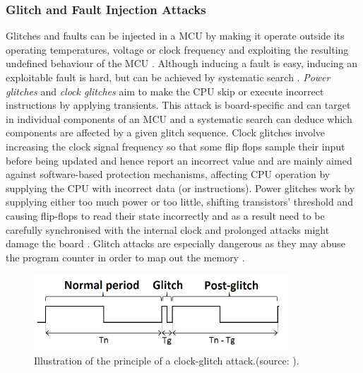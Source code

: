 	\subsubsection{Glitch and Fault Injection Attacks}
	Glitches and faults can be injected in a MCU by making it operate outside its operating temperatures, voltage or clock frequency and exploiting the resulting undefined behaviour of the MCU \citep{sergei:thesis} \citep{avr_mega}. Although inducing a fault is easy, inducing an exploitable fault is hard, but can be achieved by systematic search \citep{sergei:thesis} \citep{glitches_paper} \citep{website:riscure}. \emph{Power glitches} and \emph{clock glitches} aim to make the CPU skip or execute incorrect instructions by applying transients. This attack is board-specific and can target in individual components of an MCU and a systematic search can deduce which components are affected by a given glitch sequence. Clock glitches involve increasing the clock signal frequency so that some flip flops sample their input before being updated and hence report an incorrect value \citep{sergei:thesis} and are mainly aimed against software-based protection mechanisms, affecting CPU operation by supplying the CPU with incorrect data (or instructions). Power glitches work by supplying either too much power or too little, shifting transistors' threshold and causing flip-flops to read their state incorrectly and as a result need to be carefully synchronised with the internal clock and prolonged attacks might damage the board \citep{sergei:thesis}. Glitch attacks are especially dangerous as they may abuse the program counter in order to map out the memory \citep{glitches_paper} \citep{anderson:cautionary_note} \citep{sergei:thesis}.

	\begin{figure}
		\center
		\includegraphics[scale=0.7]{img/clock_glitch.png}
		\caption{\footnotesize Illustration of the principle of a clock-glitch attack.(source: \protect\citep{glitches_paper}).}
		\label{fig:glitch}		
	\end{figure}

